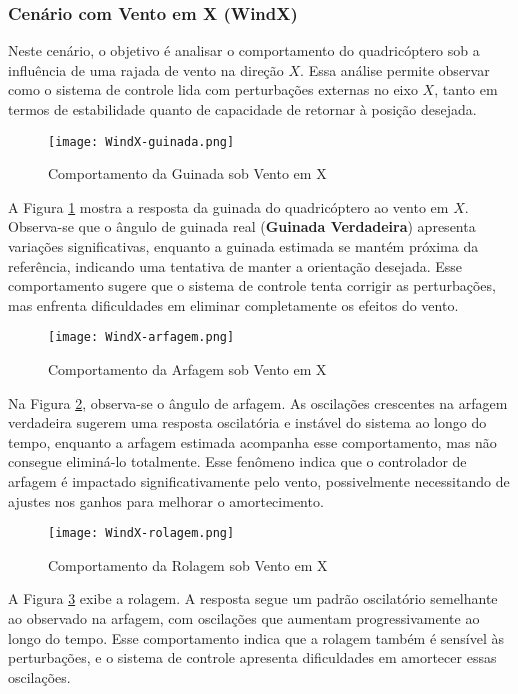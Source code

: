 \subsubsection{Cenário com Vento em X (WindX)}

Neste cenário, o objetivo é analisar o comportamento do quadricóptero sob a influência de uma rajada de vento na direção \(X\). Essa análise permite observar como o sistema de controle lida com perturbações externas no eixo \(X\), tanto em termos de estabilidade quanto de capacidade de retornar à posição desejada.

\begin{figure}[H]
    \centering
    \texttt{[image: WindX-guinada.png]}
    \caption{Comportamento da Guinada sob Vento em X}
    \label{fig:WindX-guinada}
\end{figure}

A Figura \ref{fig:WindX-guinada} mostra a resposta da guinada do quadricóptero ao vento em \(X\). Observa-se que o ângulo de guinada real (\textbf{Guinada Verdadeira}) apresenta variações significativas, enquanto a guinada estimada se mantém próxima da referência, indicando uma tentativa de manter a orientação desejada. Esse comportamento sugere que o sistema de controle tenta corrigir as perturbações, mas enfrenta dificuldades em eliminar completamente os efeitos do vento.

\begin{figure}[H]
    \centering
    \texttt{[image: WindX-arfagem.png]}
    \caption{Comportamento da Arfagem sob Vento em X}
    \label{fig:WindX-arfagem}
\end{figure}

Na Figura \ref{fig:WindX-arfagem}, observa-se o ângulo de arfagem. As oscilações crescentes na arfagem verdadeira sugerem uma resposta oscilatória e instável do sistema ao longo do tempo, enquanto a arfagem estimada acompanha esse comportamento, mas não consegue eliminá-lo totalmente. Esse fenômeno indica que o controlador de arfagem é impactado significativamente pelo vento, possivelmente necessitando de ajustes nos ganhos para melhorar o amortecimento.

\begin{figure}[H]
    \centering
    \texttt{[image: WindX-rolagem.png]}
    \caption{Comportamento da Rolagem sob Vento em X}
    \label{fig:WindX-rolagem}
\end{figure}

A Figura \ref{fig:WindX-rolagem} exibe a rolagem. A resposta segue um padrão oscilatório semelhante ao observado na arfagem, com oscilações que aumentam progressivamente ao longo do tempo. Esse comportamento indica que a rolagem também é sensível às perturbações, e o sistema de controle apresenta dificuldades em amortecer essas oscilações.

